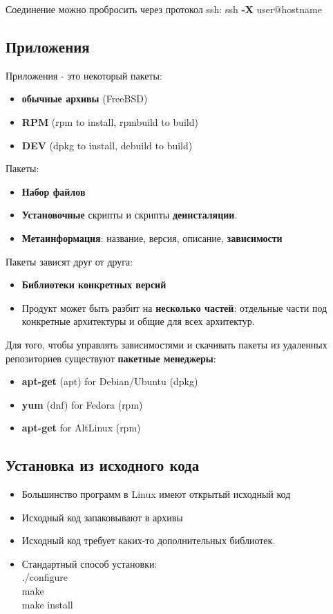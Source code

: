 Соединение можно пробросить через протокол ssh:
ssh \textbf{-X} user@hostname

\subsection{Приложения}

Приложения - это некоторый пакеты:
\begin{itemize}
	\item \textbf{обычные архивы} (FreeBSD)
	\item \textbf{RPM} (rpm to install, rpmbuild to build)
	\item \textbf{DEV} (dpkg to install, debuild to build)
\end{itemize}

Пакеты:
\begin{itemize}
	\item \textbf{Набор файлов}
	\item \textbf{Установочные} скрипты и скрипты \textbf{деинсталяции}.
	\item \textbf{Метаинформация}: название, версия, описание, \textbf{зависимости}
\end{itemize}

Пакеты зависят друг от друга:
\begin{itemize}
	\item \textbf{Библиотеки конкретных версий}
	\item Продукт может быть разбит на \textbf{несколько частей}: отдельные части под конкретные архитектуры и общие для всех архитектур.
\end{itemize}

Для того, чтобы управлять зависимостями и скачивать пакеты из удаленных репозиториев существуют \textbf{пакетные менеджеры}:
\begin{itemize}
	\item \textbf{apt-get} (apt) for Debian/Ubuntu (dpkg)
	\item \textbf{yum} (dnf) for Fedora (rpm)
	\item \textbf{apt-get} for AltLinux (rpm)
\end{itemize}

\subsection{Установка из исходного кода}

\begin{itemize}
	\item Большинство программ в Linux имеют открытый исходный код
	\item Исходный код запаковывают в архивы
	\item Исходный код требует каких-то дополнительных библиотек.
	\item Стандартный способ установки: \\
	./configure \\
	make  \\
	make install \\
\end{itemize}

